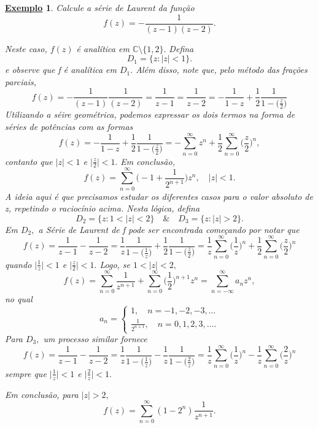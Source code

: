 \documentclass{article}
\newtheorem{example}{\underline{Exemplo}}[section]
\begin{document}
  \begin{example}
   Calcule a série de Laurent da função 
     \[
       f(z) = -\frac{1}{(z-1)(z-2)}.
     \]

     Neste caso, \(f(z)\) é analítica em \(\mathbb{C}\setminus{\{1, 2\}}.\) Defina 
       \[
         D_{1} = \{z:|z| < 1\}.
       \]
  e observe que f é analítica em \(D_{1}.\) Além disso, note que, pelo método das frações parciais,
    \[
      f(z) = -\frac{1}{(z-1)}\frac{1}{(z-2)} = \frac{1}{z-1} = \frac{1}{z-2} = -\frac{1}{1-z} + \frac{1}{2}\frac{1}{1-\bigl(\frac{z}{2}\bigr)}
    \]
  Utilizando a séire geométrica, podemos expressar os dois termos na forma de séries de potências com as formas 
    \[
      f(z) = -\frac{1}{1-z} + \frac{1}{2}\frac{1}{1-\bigl(\frac{z}{2}\bigr)} = -\sum\limits_{n=0}^{\infty}z^{n} + \frac{1}{2}\sum\limits_{n=0}^{\infty}\biggl(\frac{z}{2}\biggr)^{n},
    \]
  contanto que \(|z| < 1\) e \(\biggl\vert \frac{z}{2}\biggr\vert < 1.\) Em conclusão, 
    \[
      f(z) = \sum\limits_{n=0}^{\infty}\biggl(-1 + \frac{1}{2^{n+1}}\biggr)z^{n},\quad |z|<1.
    \]
  A ideia aqui é que precisamos estudar os diferentes casos para o valor absoluto de z, repetindo o raciocínio acima. Nesta lógica, defina 
    \[
      D_{2} = \{z: 1 < |z| < 2\}\quad\&\quad D_{3} = \{z: |z| > 2\}.
    \]
  Em \(D_{2},\) a Série de Laurent de f pode ser encontrada começando por notar que 
    \[
      f(z) = \frac{1}{z-1} - \frac{1}{z-2} = \frac{1}{z}\frac{1}{1-\bigl(\frac{1}{z}\bigr)} + \frac{1}{2}\frac{1}{1-\bigl(\frac{z}{2}\bigr)} = \frac{1}{z}\sum\limits_{n=0}^{\infty}\biggl(\frac{1}{z}\biggr)^{n} + \frac{1}{2}\sum\limits_{n=0}^{\infty}\biggl(\frac{z}{2}\biggr)^{n}
    \]
  quando \(\biggl\vert\frac{1}{z}\biggr\vert < 1\) e \(\biggl\vert \frac{z}{2}\biggr\vert < 1.\) Logo, se \(1 < |z| < 2,\)
    \[
      f(z) = \sum\limits_{n=0}^{\infty}\frac{1}{z^{n+1}} + \sum\limits_{n=0}^{\infty}\biggl(\frac{1}{2}\biggr)^{n+1}z^{n} = \sum\limits_{n=-\infty}^{\infty}a_{n}z^{n},
    \]
  no qual 
    \[
      a_{n} = \left\{\begin{array}{ll}
         1,\quad n = -1, -2, -3, \dotsc \\
         \frac{1}{2^{n+1}},\quad n=0, 1, 2, 3,\dotsc .
        \end{array}\right.
    \]
  Para \(D_{3},\) um processo similar fornece 
    \[
      f(z) = \frac{1}{z-1} - \frac{1}{z-2} = \frac{1}{z}\frac{1}{1-\bigl(\frac{1}{z}\bigr)} - \frac{1}{z}\frac{1}{1-\bigl(\frac{2}{z}\bigr)} = \frac{1}{z}\sum\limits_{n=0}^{\infty}\biggl(\frac{1}{z}\biggr)^{n} - \frac{1}{z}\sum\limits_{n=0}^{\infty}\biggl(\frac{2}{z}\biggr)^{n}
    \]
  sempre que \(\biggl\vert\frac{1}{z}\biggr\vert < 1\) e \(\biggl\vert \frac{2}{z}\biggr\vert < 1.\) 

  Em conclusão, para \(|z| > 2,\) 
    \[
      f(z) = \sum\limits_{n=0}^{\infty}(1-2^{n})\frac{1}{z^{n+1}}.
    \]
  \end{example}
\end{document}
